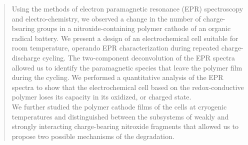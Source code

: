 \documentclass{WileyMSP-template}
\newcommand{\ik}[1]{\textcolor{RawSienna}{#1}}
\begin{document}
\begin{abstract}

\ik{
Using the methods of electron paramagnetic resonance (EPR) spectroscopy and electro-chemistry, we observed a change in the number of charge-bearing groups in a nitroxide-containing polymer cathode of an organic radical battery. We present a design of an electrochemical cell suitable for room temperature, operando EPR characterization during repeated charge-discharge cycling. The two-component deconvolution of the EPR spectra allowed us to identify the paramagnetic species that leave the polymer film during the cycling. We performed a quantitative analysis of the EPR spectra to show that the  electrochemical cell based on the redox-conductive polymer loses its capacity in its oxidized, or charged state.\\
We further studied the polymer cathode films of the cells at cryogenic temperatures and distinguished between the subsystems of weakly and strongly interacting charge-bearing nitroxide fragments that allowed us to propose two possible mechanisms of the degradation.
}

\end{abstract}

\end{document}
